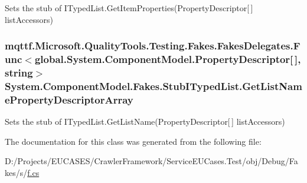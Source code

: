 Sets the stub of I\-Typed\-List.\-Get\-Item\-Properties(\-Property\-Descriptor\mbox{[}$\,$\mbox{]} list\-Accessors)

\hypertarget{class_system_1_1_component_model_1_1_fakes_1_1_stub_i_typed_list_a57c1d2dfc2decb8b8d1612718a383bac}{
\subsubsection[{Get\-List\-Name\-Property\-Descriptor\-Array}]{\setlength{\rightskip}{0pt plus 5cm}mqttf.\-Microsoft.\-Quality\-Tools.\-Testing.\-Fakes.\-Fakes\-Delegates.\-Func$<$global.\-System.\-Component\-Model.\-Property\-Descriptor\mbox{[}$\,$\mbox{]}, string$>$ System.\-Component\-Model.\-Fakes.\-Stub\-I\-Typed\-List.\-Get\-List\-Name\-Property\-Descriptor\-Array}}\label{class_system_1_1_component_model_1_1_fakes_1_1_stub_i_typed_list_a57c1d2dfc2decb8b8d1612718a383bac}


Sets the stub of I\-Typed\-List.\-Get\-List\-Name(\-Property\-Descriptor\mbox{[}$\,$\mbox{]} list\-Accessors)



The documentation for this class was generated from the following file\-:\begin{DoxyCompactItemize}
\item 
D\-:/\-Projects/\-E\-U\-C\-A\-S\-E\-S/\-Crawler\-Framework/\-Service\-E\-U\-Cases.\-Test/obj/\-Debug/\-Fakes/s/\hyperlink{s_2f_8cs}{f.\-cs}\end{DoxyCompactItemize}
